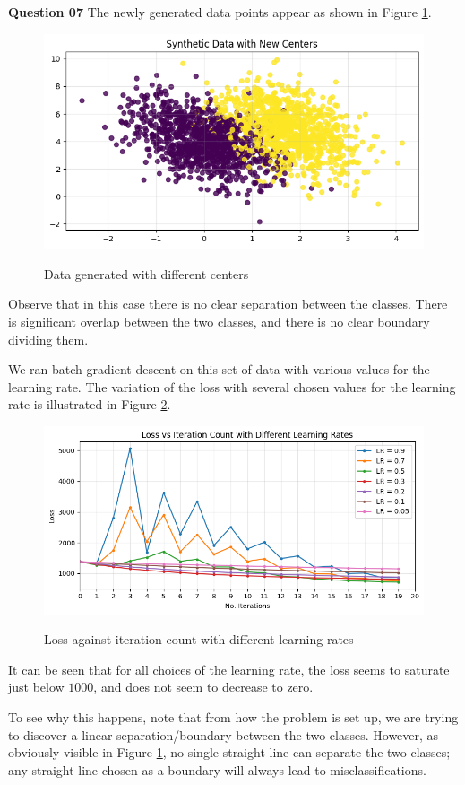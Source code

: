 \documentclass{article}[a4paper]
\begin{document}
	\textbf{Question 07} The newly generated data points appear as shown in Figure \ref{q3_7_1}.

	\begin{figure}[H]
		\centering
		\includegraphics[width=0.8\linewidth]{images/q3_7_1.png}
		\label{q3_7_1}
		\caption{Data generated with different centers}
	\end{figure}

	Observe that in this case there is no clear separation between the classes. There is significant overlap between the two classes, and there is no clear boundary dividing them.

	We ran batch gradient descent on this set of data with various values for the learning rate. The variation of the loss with several chosen values for the learning rate is illustrated in Figure \ref{q3_7_2}.

	\begin{figure}[H]
		\centering
		\includegraphics[width=0.8\linewidth]{images/q3_7_2.png}
		\label{q3_7_2}
		\caption{Loss against iteration count with different learning rates}
	\end{figure}

	It can be seen that for all choices of the learning rate, the loss seems to saturate just below $1000$, and does not seem to decrease to zero.

	To see why this happens, note that from how the problem is set up, we are trying to discover a linear separation/boundary between the two classes. However, as obviously visible in Figure \ref{q3_7_1}, no single straight line can separate the two classes; any straight line chosen as a boundary will always lead to misclassifications.
\end{document}
